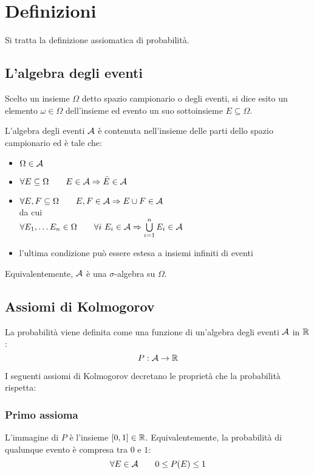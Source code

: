 \section{Definizioni}
Si tratta la definizione assiomatica di probabilità.



\subsection{L'algebra degli eventi}
\begin{defin}
	Scelto un insieme $\Omega$ detto spazio campionario o degli eventi, si dice esito un elemento $\omega\in\Omega$ dell'insieme ed evento un suo sottoinsieme $E\subseteq\Omega$.

	L'algebra degli eventi $\mathcal A$ è contenuta nell'insieme delle parti dello spazio campionario ed è tale che:

	\begin{itemize}
		\item $\Omega\in \mathcal A$
		\item $\forall E\subseteq\Omega\qquad E\in\mathcal A\Rightarrow \bar E\in\mathcal A$
		\item $\forall E, F\subseteq\Omega\qquad E,F\in\mathcal A\Rightarrow E\cup F\in\mathcal A$\\[1ex]
		      da cui\\[1ex]
		      $\forall E_1,\dots E_n\in\Omega\qquad \forall i~E_i\in\mathcal A\Rightarrow \bigcup\limits_{i=1}^n E_i \in\mathcal A$
		\item l'ultima condizione può essere estesa a insiemi infiniti di eventi
	\end{itemize}
	Equivalentemente, $\mathcal A$ è una $\sigma$-algebra su $\Omega$.
\end{defin}




\subsection{Assiomi di Kolmogorov}
La probabilità viene definita come una funzione di un'algebra degli eventi $\mathcal A$ in $\mathbb R$:
\begin{equation*}
	P:\mathcal A\to\mathbb R
\end{equation*}

I seguenti assiomi di Kolmogorov decretano le proprietà che la probabilità rispetta:


\subsubsection{Primo assioma}
L'immagine di $P$ è l'insieme $[0,1]\in\mathbb R$. Equivalentemente, la probabilità di qualunque evento è compresa tra $0$ e $1$:
\begin{equation*}
	\forall E\in\mathcal A\qquad 0\leq P(E)\leq 1
\end{equation*}


